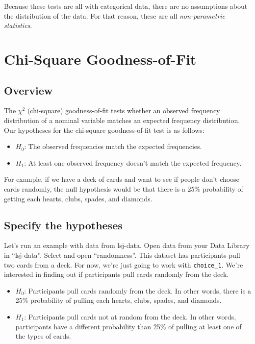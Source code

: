 \documentclass[
]{book}
\begin{document}
Because these tests are all with categorical data, there are no assumptions about the distribution of the data. For that reason, these are all \emph{non-parametric statistics}.

\hypertarget{chi-square-goodness-of-fit}{%
\section{Chi-Square Goodness-of-Fit}\label{chi-square-goodness-of-fit}}

\hypertarget{overview-3}{%
\subsection{Overview}\label{overview-3}}

The \(\chi^2\) (chi-square) goodness-of-fit tests whether an observed frequency distribution of a nominal variable matches an expected frequency distribution. Our hypotheses for the chi-square goodness-of-fit test is as follows:

\begin{itemize}
\item
  \(H_0\): The observed frequencies match the expected frequencies.
\item
  \(H_1\): At least one observed frequency doesn't match the expected frequency.
\end{itemize}

For example, if we have a deck of cards and want to see if people don't choose cards randomly, the null hypothesis would be that there is a 25\% probability of getting each hearts, clubs, spades, and diamonds.

\hypertarget{specify-the-hypotheses-1}{%
\subsection{Specify the hypotheses}\label{specify-the-hypotheses-1}}

Let's run an example with data from lsj-data. Open data from your Data Library in ``lsj-data''. Select and open ``randomness''. This dataset has participants pull two cards from a deck. For now, we're just going to work with \texttt{choice\_1}. We're interested in finding out if participants pull cards randomly from the deck.

\begin{itemize}
\item
  \(H_0\): Participants pull cards randomly from the deck. In other words, there is a 25\% probability of pulling each hearts, clubs, spades, and diamonds.
\item
  \(H_1\): Participants pull cards not at random from the deck. In other words, participants have a different probability than 25\% of pulling at least one of the types of cards.
\end{itemize}
\end{document}

